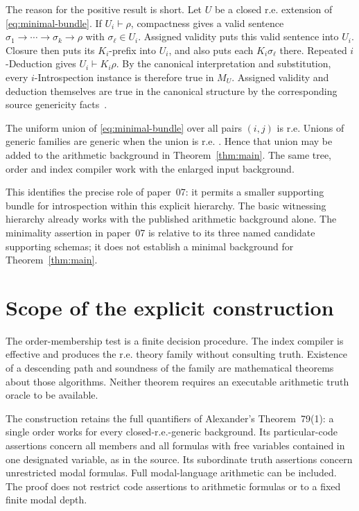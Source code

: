 \documentclass[11pt]{article}
\theoremstyle{definition}
\begin{document}
The reason for the positive result is short. Let $U$ be a closed r.e.
extension of \eqref{eq:minimal-bundle}. If $U_i\vdash\rho$, compactness
gives a valid sentence
$\sigma_1\to\cdots\to\sigma_k\to\rho$ with $\sigma_\ell\in U_i$.
Assigned validity puts this valid sentence into $U_i$. Closure then
puts its $K_i$-prefix into $U_i$, and also puts each $K_i\sigma_\ell$
there. Repeated $i$-Deduction gives $U_i\vdash K_i\rho$. By the
canonical interpretation and substitution, every $i$-Introspection
instance is therefore true in $M_U$. Assigned validity and deduction
themselves are true in the canonical structure by the corresponding
source genericity facts~\cite[Lemmas~17--18]{alexander}.

The uniform union of \eqref{eq:minimal-bundle} over all pairs $(i,j)$ is
r.e. Unions of generic families are generic when the union is r.e.
\cite[Lemma~15]{alexander}. Hence that union may be added to the
arithmetic background in Theorem~\ref{thm:main}. The same tree, order
and index compiler work with the enlarged input background.

This identifies the precise role of paper~07: it permits a smaller
supporting bundle for introspection within this explicit hierarchy.
The basic witnessing hierarchy already works with the published
arithmetic background alone. The minimality assertion in paper~07 is
relative to its three named candidate supporting schemas; it does not
establish a minimal background for Theorem~\ref{thm:main}.

\section{Scope of the explicit construction}\label{sec:scope}

The order-membership test is a finite decision procedure. The index compiler
is effective and produces the r.e. theory family without consulting truth.
Existence of a descending path and soundness of the family are mathematical
theorems about those algorithms. Neither theorem requires an executable
arithmetic truth oracle to be available.

The construction retains the full quantifiers of Alexander's
Theorem~79(1): a single order works for every closed-r.e.-generic
background. Its particular-code assertions concern all members and all
formulas with free variables contained in one designated variable, as in
the source. Its subordinate truth assertions concern unrestricted modal
formulas. Full modal-language arithmetic can be included. The proof
does not restrict code assertions to arithmetic formulas or to a fixed
finite modal depth.
\end{document}

